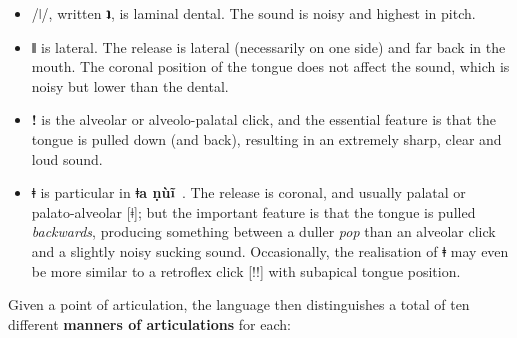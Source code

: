 \documentclass[11pt]{book}
\newcommand{\qcn}[1]{\textbf{#1}}
\newcommand{\langname}{\qcn{ǂa ṇùĩ}~}
\begin{document}
\begin{itemize}
	\item  /ǀ/, written \qcn{ʇ}, is laminal dental. The sound is noisy and highest in pitch.
	\item \qcn{ǁ} is lateral. The release is lateral (necessarily on one side) and far back in the mouth. The coronal position of the tongue does not affect the sound, which is noisy but lower than the dental.
	\item \qcn{!} is the alveolar or alveolo-palatal click, and the essential feature is that the tongue is pulled down (and back), resulting in an extremely sharp, clear and loud sound.
	 \item \qcn{ǂ} is particular in \langname. The release is coronal, and usually palatal or palato-alveolar [ǂ]; but the important feature is that the tongue is pulled \emph{backwards}, producing something between a duller \emph{pop} than an alveolar click and a slightly noisy sucking sound. Occasionally, the realisation of \qcn{ǂ} may even be more similar to a retroflex click [!!] with subapical tongue position.
\end{itemize}

Given a point of articulation, the language then distinguishes a total of ten different \textbf{manners of articulations} for each:
\end{document}
